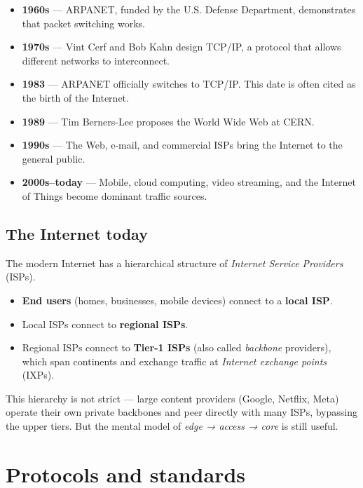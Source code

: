 \documentclass[
  letterpaper,
  DIV=11,
  numbers=noendperiod]{scrreprt}
\providecommand{\tightlist}{%
  \setlength{\itemsep}{0pt}\setlength{\parskip}{0pt}}
\begin{document}
\begin{itemize}
\tightlist
\item
  \textbf{1960s} --- ARPANET, funded by the U.S. Defense Department,
  demonstrates that packet switching works.
\item
  \textbf{1970s} --- Vint Cerf and Bob Kahn design TCP/IP, a protocol
  that allows different networks to interconnect.
\item
  \textbf{1983} --- ARPANET officially switches to TCP/IP. This date is
  often cited as the birth of the Internet.
\item
  \textbf{1989} --- Tim Berners-Lee proposes the World Wide Web at CERN.
\item
  \textbf{1990s} --- The Web, e-mail, and commercial ISPs bring the
  Internet to the general public.
\item
  \textbf{2000s--today} --- Mobile, cloud computing, video streaming,
  and the Internet of Things become dominant traffic sources.
\end{itemize}

\subsection{The Internet today}\label{the-internet-today}

The modern Internet has a hierarchical structure of \emph{Internet
Service Providers} (ISPs).

\begin{itemize}
\tightlist
\item
  \textbf{End users} (homes, businesses, mobile devices) connect to a
  \textbf{local ISP}.
\item
  Local ISPs connect to \textbf{regional ISPs}.
\item
  Regional ISPs connect to \textbf{Tier-1 ISPs} (also called
  \emph{backbone} providers), which span continents and exchange traffic
  at \emph{Internet exchange points} (IXPs).
\end{itemize}

This hierarchy is not strict --- large content providers (Google,
Netflix, Meta) operate their own private backbones and peer directly
with many ISPs, bypassing the upper tiers. But the mental model of
\emph{edge → access → core} is still useful.

\section{Protocols and standards}\label{sec-protocols}
\end{document}
